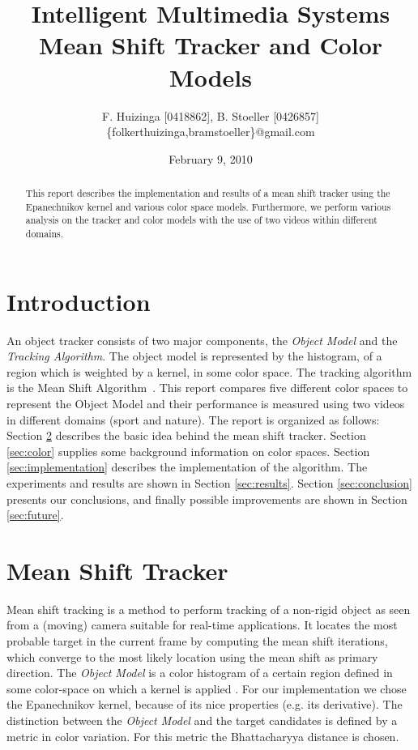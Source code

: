 \documentclass[11pt]{article}
\title{Intelligent Multimedia Systems \\ Mean Shift Tracker and Color Models}
\author{F. Huizinga [0418862], B. Stoeller [0426857] \\
      \{folkerthuizinga,bramstoeller\}@gmail.com}
\date{February 9, 2010}
\begin{document}
\maketitle

\begin{abstract}
This report describes the implementation and results of a mean shift tracker
using the Epanechnikov kernel and various color space models. Furthermore, we
perform various analysis on the tracker and color models with the use of two
videos within different domains.
\end{abstract}


\section{Introduction} \label{sec:intro}
An object tracker consists of two major components, the \emph{Object Model} and
the \emph{Tracking Algorithm}. The object model is represented by the
histogram, of a region which is weighted by a kernel, in some color space. The
tracking algorithm is the Mean Shift Algorithm~\cite{kernel-basedobject,
real-timetracking}. This report compares five different color spaces to
represent the Object Model and their performance is measured using two videos
in different domains (sport and nature). The report is organized as follows:
Section \ref{sec:meanshift} describes the basic idea behind the mean shift
tracker. Section \ref{sec:color} supplies some background information on color
spaces. Section \ref{sec:implementation} describes the implementation of the
algorithm. The experiments and results are shown in Section \ref{sec:results}.
Section \ref{sec:conclusion} presents our conclusions, and finally possible
improvements are shown in Section \ref{sec:future}.

\section{Mean Shift Tracker} \label{sec:meanshift}
Mean shift tracking is a method to perform tracking of a non-rigid object as
seen from a (moving) camera suitable for real-time applications. It locates the
most probable target in the current frame by computing the mean shift
iterations, which converge to the most likely location using the mean shift as
primary direction. The \emph{Object Model} is a color histogram of a certain
region defined in some color-space on which a kernel is applied .  For our
implementation we chose the Epanechnikov kernel, because of its nice properties
(e.g. its derivative). The distinction between the \emph{Object Model} and the
target candidates is defined by a metric in color variation. For this metric
the Bhattacharyya distance is chosen. 
\end{document}
